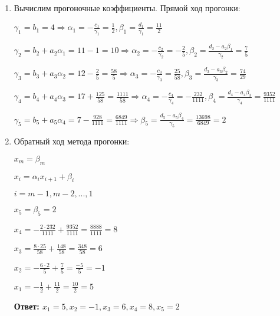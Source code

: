 \documentclass[a4paper,12pt]{article} %
\begin{document}
\begin{enumerate}

\item Вычислим прогоночные коэффициенты. Прямой ход прогонки:

$\gamma_1 = b_1 = 4 \Rightarrow 
\alpha_1 = -\frac{c_1}{\gamma_1} = \frac{1}{2}, 
\beta_1 = \frac{d_1}{\gamma_1} = \frac{11}{2}$

$\gamma_2 = b_2 + a_2\alpha_1 = 11 - 1 = 10  \Rightarrow 
\alpha_2 = -\frac{c_2}{\gamma_2} = -\frac{2}{5}, 
\beta_2 = \frac{d_2 - a_2\beta_1}{\gamma_2} = \frac{7}{5}$

$\gamma_3 = b_3 + a_3\alpha_2 = 12 - \frac{2}{5} = \frac{58}{5}  \Rightarrow 
\alpha_3 = -\frac{c_3}{\gamma_3} = \frac{25}{58}, 
\beta_3 = \frac{d_3 - a_3\beta_2}{\gamma_3} = \frac{74}{29}$

$\gamma_4 = b_4 + a_4\alpha_3 = 17 + \frac{125}{58} = \frac{1111}{58}  \Rightarrow 
\alpha_4 = -\frac{c_4}{\gamma_4} = -\frac{232}{1111}, 
\beta_4 = \frac{d_4 - a_4\beta_3}{\gamma_4} = \frac{9352}{1111}$

$\gamma_5 = b_5 + a_5\alpha_4 = 7 - \frac{928}{1111} = \frac{6849}{1111}  \Rightarrow 
\beta_5 = \frac{d_5 - a_5\beta_4}{\gamma_5} = \frac{13698}{6849} = 2$

\item Обратный ход метода прогонки:

\begin{center}
    $x_m = \beta_m$

    $x_i = \alpha_i x_{i+1} + \beta_i$

    $i = m - 1, m - 2, ..., 1$
\end{center}

$x_5 = \beta_5 = 2$

$x_4 = -\frac{2 \cdot 232}{1111} + \frac{9352}{1111} = \frac{8888}{1111} = 8$

$x_3 = \frac{8 \cdot 25}{58} + \frac{148}{58} = \frac{348}{58} = 6$

$x_2 = -\frac{6 \cdot 2}{5} + \frac{7}{5} = \frac{-5}{5} = -1$

$x_1 = -\frac{1}{2} + \frac{11}{2} = \frac{10}{2} = 5$

\textbf{Ответ: $x_1 = 5, x_2 = -1, x_3 = 6, x_4 = 8, x_5 = 2$}

\end{enumerate}
\end{document}
